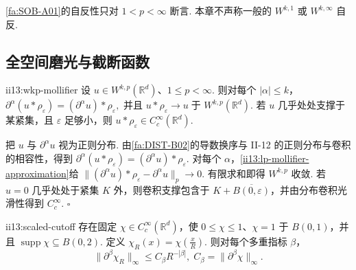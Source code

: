 \begin{FAWarning}[自反性的端点边界]
\autoref{fa:SOB-A01}的自反性只对 \(\displaystyle1<p<\infty\) 断言. 本章不声称一般的 \(\displaystyle W^{k,1}\) 或 \(\displaystyle W^{k,\infty}\) 自反.
\end{FAWarning}

\subsection{全空间磨光与截断函数}

\begin{FAProposition}{ii13:wkp-mollifier}
设 \(\displaystyle u\in W^{k,p}(\mathbb R^d)\)、\(\displaystyle1\leqslant p<\infty\). 则对每个 \(\displaystyle|\alpha|\leqslant k\)， \(\displaystyle \partial^\alpha(u*\rho_\varepsilon) = (\partial^\alpha u)*\rho_\varepsilon,\)
并且 \(\displaystyle u*\rho_\varepsilon \longrightarrow u \;\text{于 }W^{k,p}(\mathbb R^d).\)
若 \(\displaystyle u\) 几乎处处支撑于某紧集，且 \(\displaystyle\varepsilon\) 足够小，则 \(\displaystyle u*\rho_\varepsilon\in C_c^\infty(\mathbb R^d)\).
\end{FAProposition}

\begin{FAProof}
把 \(\displaystyle u\) 与 \(\displaystyle\partial^\alpha u\) 视为正则分布. 由\autoref{fa:DIST-B02}的导数换序与 II-12 的正则分布与卷积的相容性，得到 \(\displaystyle \partial^\alpha(u*\rho_\varepsilon) = (\partial^\alpha u)*\rho_\varepsilon.\)
对每个 \(\displaystyle\alpha\)，\autoref{ii13:lp-mollifier-approximation}给 \(\displaystyle \|(\partial^\alpha u)*\rho_\varepsilon-\partial^\alpha u\|_p \longrightarrow0.\)
有限求和即得 \(\displaystyle W^{k,p}\) 收敛. 若 \(\displaystyle u=0\) 几乎处处于紧集 \(\displaystyle K\) 外，则卷积支撑包含于 \(\displaystyle K+\overline{B(0,\varepsilon)}\)，并由分布卷积光滑性得到 \(\displaystyle C_c^\infty\).
\hfill\(\square\)
\end{FAProof}

\begin{FALemma}[B][缩放的全局截断函数]{ii13:scaled-cutoff}
存在固定 \(\displaystyle\chi\in C_c^\infty(\mathbb R^d)\)，使 \(\displaystyle0\leqslant\chi\leqslant1\)、\(\displaystyle\chi=1\) 于 \(\displaystyle B(0,1)\)，并且 \(\displaystyle\operatorname{supp}\chi\subseteq B(0,2)\). 定义 \(\displaystyle\chi_R(x)=\chi(\frac{x}{R})\). 则对每个多重指标 \(\displaystyle\beta\)，
\[
\|\partial^\beta\chi_R\|_\infty
\leqslant
C_\beta R^{-|\beta|},
\;
C_\beta=\|\partial^\beta\chi\|_\infty.
\]
\end{FALemma}


